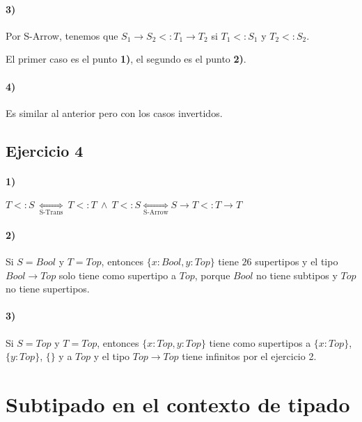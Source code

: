 \documentclass[10pt,a4paper, landscape]{article}
\begin{document}
\begin{multicols}{2}
		\paragraph{3)} Por S-Arrow, tenemos que $S_1\to S_2 <: T_1\to T_2$ si $T_1 <: S_1$ y $T_2 <: S_2$. 
		
		El primer caso es el punto \textbf{1)}, el segundo es el punto \textbf{2)}.
		\paragraph{4)} Es similar al anterior pero con los casos invertidos.
		
		\subsection{Ejercicio 4}
		\paragraph{1)} $T<:S~\underset{\text{S-Trans}}{\iff} ~ T<:T~\land~T<:S \underset{\text{S-Arrow}}{\iff} S\to T <: T\to T$
		\paragraph{2)} Si $S = Bool$ y $T = Top$, entonces $\{x:Bool, y:Top\}$ tiene $26$ supertipos y el tipo $Bool\to Top$ solo tiene como supertipo a $Top$, porque $Bool$ no tiene subtipos y $Top$ no tiene supertipos.
		\paragraph{3)} Si $S = Top$ y $T = Top$, entonces $\{x:Top, y:Top\}$ tiene como supertipos a $\{x:Top\}$, $\{y:Top\}$, $\{\}$ y a $Top$ y el tipo $Top\to Top$ tiene infinitos por el ejercicio 2.
		
		\subsection{}
		
		
	\end{multicols}
	
	
	
	\newpage
	\section*{\centering Subtipado en el contexto de tipado}
	
\end{document}
